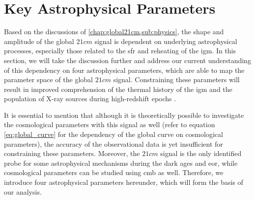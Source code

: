 \documentclass[12pt, TexShade, letterpaper]{report}
\begin{document}
\section{Key Astrophysical Parameters}
Based on the discussions of \ref{chap:global21cm,sub:physics}, the shape and amplitude of the global $21cm$ signal is dependent on underlying astrophysical processes, especially those related to the \gls{sfr} and reheating of the \gls{igm}. In this section, we will take the discussion further and address our current understanding of this dependency on four astrophysical parameters, which are able to map the parameter space of the global $21cm$ signal. Constraining these parameters will result in improved comprehension of the thermal history of the \gls{igm} and the population of X-ray sources during high-redshift epochs \cite{21century}.\par
It is essential to mention that although it is theoretically possible to investigate the cosmological parameters with this signal as well (refer to equation \ref{eq:global_curve} for the dependency of the global curve on cosmological parameters), the accuracy of the observational data is yet insufficient for constraining these parameters. Moreover, the $21cm$ signal is the only identified probe for some astrophysical mechanisms during the dark ages and \gls{eor}, while cosmological parameters can be studied using \gls{cmb} as well. Therefore, we introduce four astrophysical parameters hereunder, which will form the basis of our analysis. \par
\end{document}
